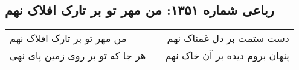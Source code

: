 \begin{center}
\section*{رباعی شماره ۱۳۵۱: من مهر تو بر تارک افلاک نهم}
\label{sec:1351}
\begin{longtable}{l p{0.5cm} r}
من مهر تو بر تارک افلاک نهم
&&
دست ستمت بر دل غمناک نهم
\\
هر جا که تو بر روی زمین پای نهی
&&
پنهان بروم دیده بر آن خاک نهم
\\
\end{longtable}
\end{center}
